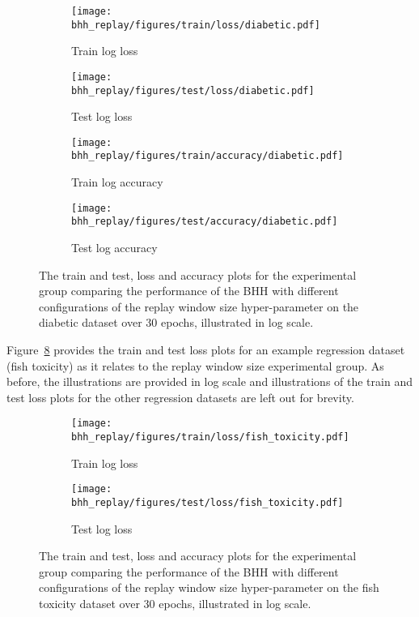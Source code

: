 \begin{figure}[htbp]
	\begin{subfigure}{0.5\textwidth}
		\centering
		\texttt{[image: bhh\_replay/figures/train/loss/diabetic.pdf]}
		\caption{Train log loss}
		\label{fig:results:replay:figures:loss:train:diabetic}
	\end{subfigure}
	\begin{subfigure}{0.5\textwidth}
		\centering
		\texttt{[image: bhh\_replay/figures/test/loss/diabetic.pdf]}
		\caption{Test log loss}
		\label{fig:results:replay:figures:loss:test:diabetic}
	\end{subfigure}
	\par\bigskip
	\begin{subfigure}{0.5\textwidth}
		\centering
		\texttt{[image: bhh\_replay/figures/train/accuracy/diabetic.pdf]}
		\caption{Train log accuracy}
		\label{fig:results:replay:figures:accuracy:train:diabetic}
	\end{subfigure}
	\begin{subfigure}{0.5\textwidth}
		\centering
		\texttt{[image: bhh\_replay/figures/test/accuracy/diabetic.pdf]}
		\caption{Test log accuracy}
		\label{fig:results:replay:figures:accuracy:test:diabetic}
	\end{subfigure}
	\par\bigskip
	\caption{The train and test, loss and accuracy plots for the experimental group comparing the performance of the \acs{BHH} with different configurations of the replay window size hyper-parameter on the diabetic dataset over 30 epochs, illustrated in log scale.}
	\label{fig:results:replay:figures:diabetic}
\end{figure}

Figure~\ref{fig:results:replay:figures:fish_toxicity} provides the train and test loss plots for an example regression dataset (fish toxicity) as it relates to the replay window size experimental group. As before, the illustrations are provided in log scale and illustrations of the train and test loss plots for the other regression datasets are left out for brevity.

\begin{figure}[htbp]
	\begin{subfigure}{0.5\textwidth}
		\centering
		\texttt{[image: bhh\_replay/figures/train/loss/fish\_toxicity.pdf]}
		\caption{Train log loss}
		\label{fig:results:replay:figures:loss:train:fish_toxicity}
	\end{subfigure}
	\begin{subfigure}{0.5\textwidth}
		\centering
		\texttt{[image: bhh\_replay/figures/test/loss/fish\_toxicity.pdf]}
		\caption{Test log loss}
		\label{fig:results:replay:figures:loss:test:fish_toxicity}
	\end{subfigure}
	\par\bigskip
	\caption{The train and test, loss and accuracy plots for the experimental group comparing the performance of the \acs{BHH} with different configurations of the replay window size hyper-parameter on the fish toxicity dataset over 30 epochs, illustrated in log scale.}
	\label{fig:results:replay:figures:fish_toxicity}
\end{figure}

